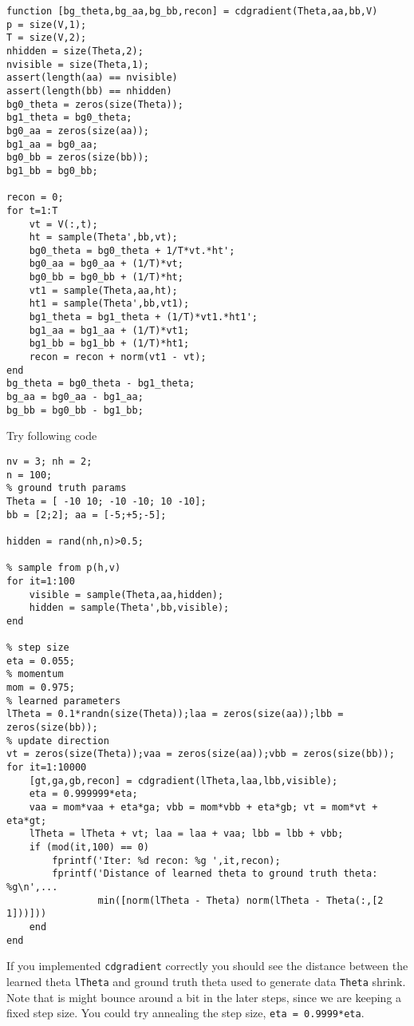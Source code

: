 \documentclass{article}
\begin{document}
\begin{verbatim}
function [bg_theta,bg_aa,bg_bb,recon] = cdgradient(Theta,aa,bb,V)
p = size(V,1);
T = size(V,2);
nhidden = size(Theta,2);
nvisible = size(Theta,1);
assert(length(aa) == nvisible)
assert(length(bb) == nhidden)
bg0_theta = zeros(size(Theta));
bg1_theta = bg0_theta;
bg0_aa = zeros(size(aa));
bg1_aa = bg0_aa;
bg0_bb = zeros(size(bb));
bg1_bb = bg0_bb;

recon = 0;
for t=1:T
    vt = V(:,t);
    ht = sample(Theta',bb,vt);
    bg0_theta = bg0_theta + 1/T*vt.*ht';
    bg0_aa = bg0_aa + (1/T)*vt;
    bg0_bb = bg0_bb + (1/T)*ht;
    vt1 = sample(Theta,aa,ht);
    ht1 = sample(Theta',bb,vt1);
    bg1_theta = bg1_theta + (1/T)*vt1.*ht1';
    bg1_aa = bg1_aa + (1/T)*vt1;
    bg1_bb = bg1_bb + (1/T)*ht1;
    recon = recon + norm(vt1 - vt);
end
bg_theta = bg0_theta - bg1_theta;
bg_aa = bg0_aa - bg1_aa;
bg_bb = bg0_bb - bg1_bb;
\end{verbatim}




Try following code
\begin{verbatim}
nv = 3; nh = 2;
n = 100;
% ground truth params
Theta = [ -10 10; -10 -10; 10 -10];
bb = [2;2]; aa = [-5;+5;-5];

hidden = rand(nh,n)>0.5;

% sample from p(h,v)
for it=1:100
    visible = sample(Theta,aa,hidden);
    hidden = sample(Theta',bb,visible);
end

% step size
eta = 0.055;
% momentum
mom = 0.975;
% learned parameters
lTheta = 0.1*randn(size(Theta));laa = zeros(size(aa));lbb = zeros(size(bb));
% update direction
vt = zeros(size(Theta));vaa = zeros(size(aa));vbb = zeros(size(bb));
for it=1:10000
    [gt,ga,gb,recon] = cdgradient(lTheta,laa,lbb,visible);
	eta = 0.999999*eta;
    vaa = mom*vaa + eta*ga; vbb = mom*vbb + eta*gb; vt = mom*vt + eta*gt;
    lTheta = lTheta + vt; laa = laa + vaa; lbb = lbb + vbb;
    if (mod(it,100) == 0)
        fprintf('Iter: %d recon: %g ',it,recon);
        fprintf('Distance of learned theta to ground truth theta: %g\n',...
                min([norm(lTheta - Theta) norm(lTheta - Theta(:,[2 1]))]))
    end
end
\end{verbatim}

If you implemented \verb|cdgradient| correctly you should see the distance between the
learned theta \verb|lTheta| and ground truth theta used to generate data \verb|Theta| shrink.
Note that is might bounce around a bit in the later steps, since we are keeping a fixed
step size. You could try annealing the step size, \eg \verb|eta = 0.9999*eta|.
\end{document}
